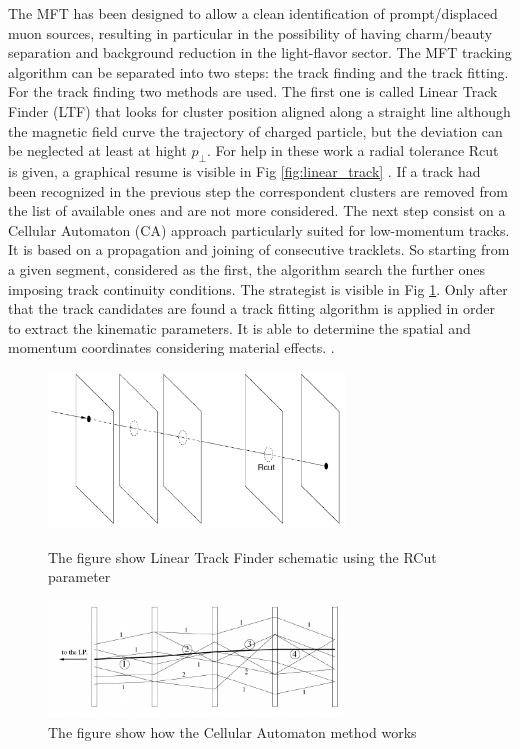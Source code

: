 \documentclass[12pt,a4paper]{book}
\begin{document}
 The MFT has been designed to allow a clean identification of prompt/displaced muon sources, resulting in particular in the possibility of having charm/beauty separation and background reduction in the light-flavor sector. The MFT tracking algorithm can be separated into two steps: the track finding and the track fitting. For the track finding two methods are used. The first one is called Linear Track Finder (LTF) that looks for cluster position aligned along a straight line although the magnetic field curve the trajectory of charged particle, but the deviation can be neglected at least at hight $p_\perp$. For help in these work a radial tolerance Rcut is given, a graphical resume is visible in Fig \ref{fig:linear_track} . If a track had been recognized in the previous step the correspondent clusters are removed from the list of available ones and are not more considered. The next step consist on a Cellular Automaton (CA) approach particularly suited for low-momentum tracks. It is based on a propagation and joining of consecutive tracklets. So starting from a given segment, considered as the first, the algorithm search the further ones imposing track continuity conditions. The strategist is visible in Fig \ref{fig:CA_track}. Only after that the track candidates are found a track fitting algorithm is applied in order to extract the kinematic parameters. It is able to determine the spatial and momentum coordinates considering material effects. \cite{Herrmann:2920632}.
\begin{figure}
	\centering
	\begin{minipage}{0.45\textwidth}
		\includegraphics[width=0.7\textwidth]{pictures/linear_track.png}
		\caption{The figure show Linear Track Finder schematic using the RCut parameter \cite{CERN-LHCC-2015-001}}
		\label{fig:linear_track}
		
	\end{minipage}
	\begin{minipage}{0.5\textwidth}
		\includegraphics[width=0.7\textwidth]{pictures/CA_track.png}
		\caption{The figure show how the Cellular Automaton method works \cite{CERN-LHCC-2015-001}}
		\label{fig:CA_track}
	\end{minipage}%
\end{figure}
\end{document}
